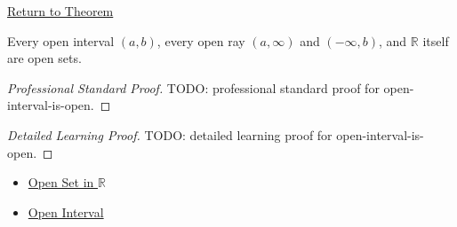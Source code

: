 \newpage
{}
\label{prf:open-interval-is-open}

\begin{remark*}[Return]
\hyperref[thm:open-interval-is-open]{Return to Theorem}
\end{remark*}

\begin{theorem*}
Every open interval $(a,b)$, every open ray $(a,\infty)$ and $(-\infty,b)$, and $\mathbb{R}$ itself are open sets.
\end{theorem*}

\begin{proof}[Professional Standard Proof]
\LRAProofBodyStart
TODO: professional standard proof for open-interval-is-open.
\end{proof}

\begin{proof}[Detailed Learning Proof]
\LRAProofBodyStart
TODO: detailed learning proof for open-interval-is-open.
\end{proof}

\begin{remark*}
\end{remark*}

\begin{dependencies}
\begin{itemize}
  \item \hyperref[def:open-set]{Open Set in $\mathbb{R}$}
  \item \hyperref[def:open-interval]{Open Interval}
\end{itemize}
\end{dependencies}

\clearpage
